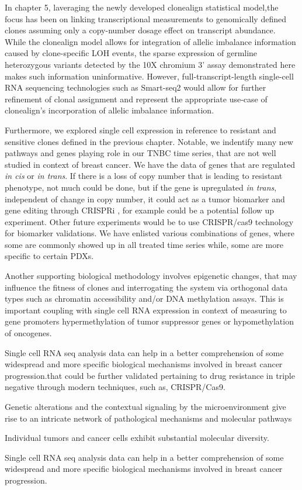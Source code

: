 In chapter 5, laveraging the newly developed clonealign statistical model,the focus has been on linking transcriptional measurements to genomically defined clones assuming only a copy-number dosage effect on transcript abundance. While the clonealign model allows for integration of allelic imbalance information caused by clone-specific \ac{LOH} events, the sparse expression of germline heterozygous variants detected by the 10X chromium 3' assay demonstrated here makes such information uninformative. However, full-transcript-length single-cell RNA sequencing technologies such as Smart-seq2 \cite{picelli2014full} would allow for further refinement of clonal assignment and represent the appropriate use-case of clonealign’s incorporation of allelic imbalance information.


Furthermore, we explored single cell expression in reference to resistant and sensitive clones defined in the previous chapter. Notable, we indentify many new pathways and genes playing role in our TNBC time series, that are not well studied in context of breast cancer. We have the data of genes that are regulated \textit{in cis} or \textit{in trans}. If there is a loss of copy number that is leading to resistant phenotype, not much could be done, but if the gene is upregulated \textit{in trans}, independent of change in copy number, it could act as a tumor biomarker and gene editing through CRISPRi \cite{larson2013crispr}, for example could be a potential follow up experiment.
Other future experiments would be to use CRISPR/cas9 \cite{doudna2014new} technology for biomarker validations. We have enlisted various combinations of genes, where some are commonly showed up in all treated time series while, some are more specific to certain PDXs. 

Another supporting biological methodology involves epigenetic changes, that may influence the fitness of clones and interrogating the system via orthogonal data types such as chromatin accessibility and/or DNA methylation assays. This is important coupling with single cell RNA expression in context of measuring to gene promoters hypermethylation of tumor suppressor genes  or hypomethylation of oncogenes.








 
 
 
 
 
 
 Single cell RNA seq analysis data can help in a better comprehension of some widespread and more specific biological mechanisms involved in breast cancer progression.that could be further validated pertaining to drug resistance in triple negative through modern techniques, such as, CRISPR/Cas9.

Genetic alterations and the contextual signaling by the microenvironment give rise to an intricate network of pathological mechanisms and molecular pathways


Individual tumors and cancer cells exhibit substantial molecular diversity.

Single cell RNA seq analysis data can help in a better comprehension of some widespread and more specific biological mechanisms involved in breast cancer progression.